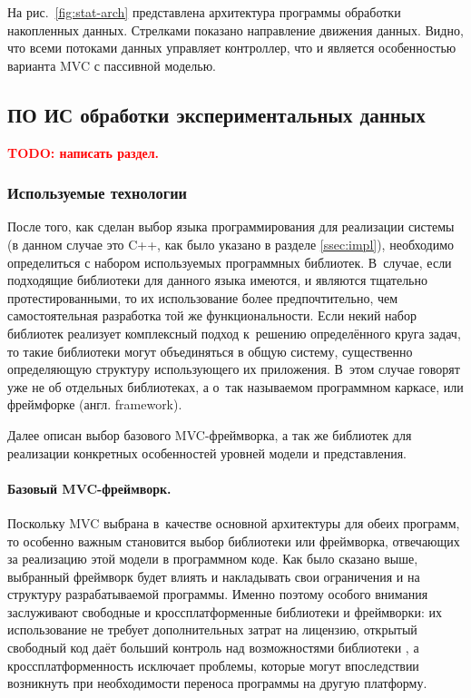\documentclass[a4paper, 14pt, titlepage]{extarticle}
\newcommand{\todo}[1]{\textbf{\textcolor{red}{TODO: #1}}}
\newcommand{\eng}[1]{\foreignlanguage{english}{#1}}
\let\oldparagraph\paragraph
\renewcommand{\paragraph}[1]{\oldparagraph{\indent #1}}
\begin{document}
  На рис.~\ref{fig:stat-arch} представлена архитектура программы обработки накопленных данных. Стрелками
  показано направление движения данных. Видно, что всеми потоками данных управляет контроллер, что и
  является особенностью варианта MVC с пассивной моделью.

  \subsection{ПО ИС обработки экспериментальных данных}

  \todo{написать раздел.}

  \subsubsection{Используемые технологии}\label{ssec:techno}

  После того, как сделан выбор языка программирования для реализации системы (в данном случае это
  C++, как было указано в разделе \ref{ssec:impl}), необходимо определиться с набором используемых
  программных библиотек. В~случае, если подходящие библиотеки для данного языка имеются, и являются тщательно
  протестированными, то их использование более предпочтительно, чем самостоятельная разработка той
  же функциональности. Если некий набор библиотек реализует комплексный подход к~решению
  определённого круга задач, то такие библиотеки могут объединяться в общую систему, существенно
  определяющую структуру использующего их приложения. В~этом случае говорят уже не об отдельных
  библиотеках, а о~так называемом программном каркасе, или фреймфорке (англ. \eng{framework}).

  Далее описан выбор базового MVC-фреймворка, а так же библиотек для реализации
  конкретных особенностей уровней модели и представления.

  \paragraph{Базовый MVC-фреймворк.}
  Поскольку MVC выбрана в~качестве основной архитектуры для обеих программ, то особенно важным
  становится выбор библиотеки или фреймворка, отвечающих за реализацию этой модели в программном
  коде. Как было сказано выше, выбранный фреймворк будет влиять и накладывать свои ограничения и на
  структуру разрабатываемой программы. Именно поэтому особого внимания заслуживают свободные и
  кроссплатформенные библиотеки и фреймворки: их использование не требует дополнительных затрат на
  лицензию, открытый свободный код даёт больший контроль над возможностями библиотеки \cite{open-source},
  а кроссплатформенность исключает проблемы, которые могут впоследствии возникнуть при необходимости
  переноса программы на другую платформу.
\end{document}
